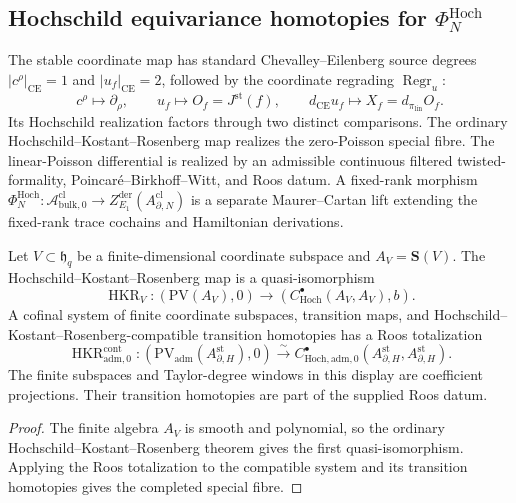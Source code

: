 \subsection{\texorpdfstring{Hochschild equivariance homotopies for \(\Phi_N^{\mathrm{Hoch}}\)}{Hochschild equivariance homotopies for Phi N Hoch}}
\label{ssec:completion-hochschild-centrality}

The stable coordinate map has standard Chevalley--Eilenberg source
degrees \(|c^\rho|_{\mathrm{CE}}=1\) and
\(|u_f|_{\mathrm{CE}}=2\), followed by the coordinate regrading
\(\operatorname{Regr}_u\):
\[
  c^\rho\longmapsto\partial_\rho,\qquad
  u_f\longmapsto O_f=J^{\mathrm{st}}(f),\qquad
  d_{\mathrm{CE}}u_f\longmapsto
  X_f=d_{\pi_{\mathrm{lin}}}O_f.
\]
Its Hochschild realization factors through two distinct comparisons.
The ordinary Hochschild--Kostant--Rosenberg map realizes the
zero-Poisson special fibre.  The linear-Poisson differential is
realized by an admissible continuous filtered twisted-formality,
Poincar\'e--Birkhoff--Witt, and Roos datum.  A fixed-rank morphism
\(\Phi_N^{\mathrm{Hoch}}\colon
\mathcal A^{\mathrm{cl}}_{\mathrm{bulk},0}\to
Z^{\mathrm{der}}_{E_1}(A^{\mathrm{cl}}_{\partial,N})\) is a
separate Maurer--Cartan lift extending the fixed-rank trace
cochains and Hamiltonian derivations.

\begin{prop}
\label{prop:completion-hkr-zero-poisson}
Let \(V\subset\mathfrak h_q\) be a finite-dimensional coordinate
subspace and \(A_V=\mathbf S(V)\).  The
Hochschild--Kostant--Rosenberg map is a quasi-isomorphism
\[
  \operatorname{HKR}_V\colon
  (\mathrm{PV}(A_V),0)
  \longrightarrow
  (C^\bullet_{\mathrm{Hoch}}(A_V,A_V),b).
\]
A cofinal system of finite coordinate subspaces, transition maps,
and Hochschild--Kostant--Rosenberg-compatible transition homotopies
has a Roos totalization
\[
  \operatorname{HKR}^{\mathrm{cont}}_{\mathrm{adm},0}\colon
  (\mathrm{PV}_{\mathrm{adm}}
    (A_{\partial,H}^{\mathrm{st}}),0)
  \xrightarrow{\sim}
  C^\bullet_{\mathrm{Hoch},\mathrm{adm},0}
    (A_{\partial,H}^{\mathrm{st}},
     A_{\partial,H}^{\mathrm{st}}).
\]
The finite subspaces and Taylor-degree windows in this display are
coefficient projections.  Their transition homotopies are part of
the supplied Roos datum.
\end{prop}

\begin{proof}
The finite algebra \(A_V\) is smooth and polynomial, so the ordinary
Hochschild--Kostant--Rosenberg theorem gives the first
quasi-isomorphism.  Applying the Roos totalization to the compatible
system and its transition homotopies gives the completed special
fibre.
\end{proof}


